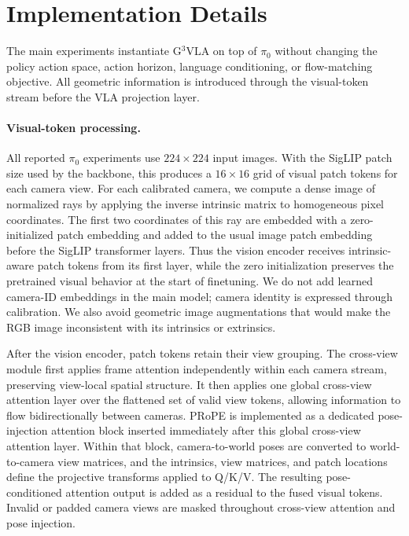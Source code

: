 \section{Implementation Details}
\label{app:implementation}

The main experiments instantiate G$^3$VLA on top of $\pi_0$ without changing the policy action space, action horizon, language conditioning, or flow-matching objective. All geometric information is introduced through the visual-token stream before the VLA projection layer.

\paragraph{Visual-token processing.}
All reported $\pi_0$ experiments use $224\times224$ input images. With the SigLIP patch size used by the backbone, this produces a $16\times16$ grid of visual patch tokens for each camera view. For each calibrated camera, we compute a dense image of normalized rays by applying the inverse intrinsic matrix to homogeneous pixel coordinates. The first two coordinates of this ray are embedded with a zero-initialized patch embedding and added to the usual image patch embedding before the SigLIP transformer layers. Thus the vision encoder receives intrinsic-aware patch tokens from its first layer, while the zero initialization preserves the pretrained visual behavior at the start of finetuning. We do not add learned camera-ID embeddings in the main model; camera identity is expressed through calibration. We also avoid geometric image augmentations that would make the RGB image inconsistent with its intrinsics or extrinsics.

After the vision encoder, patch tokens retain their view grouping. The cross-view module first applies frame attention independently within each camera stream, preserving view-local spatial structure. It then applies one global cross-view attention layer over the flattened set of valid view tokens, allowing information to flow bidirectionally between cameras. PRoPE is implemented as a dedicated pose-injection attention block inserted immediately after this global cross-view attention layer. Within that block, camera-to-world poses are converted to world-to-camera view matrices, and the intrinsics, view matrices, and patch locations define the projective transforms applied to Q/K/V. The resulting pose-conditioned attention output is added as a residual to the fused visual tokens. Invalid or padded camera views are masked throughout cross-view attention and pose injection.

